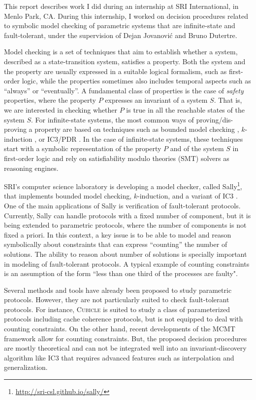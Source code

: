
This report describes work I did during an internship at SRI
International, in Menlo Park, CA. During this internship, I worked on
decision procedures related to symbolic model checking of parametric
systems that are infinite-state and fault-tolerant, under the
supervision of Dejan Jovanović and Bruno Dutertre.

Model checking is a set of techniques that aim to establish whether a
system, described as a state-transition system, satisfies a property.
Both the system and the property are usually expressed in a suitable
logical formalism, such as first-order logic, while the properties
sometimes also includes temporal aspects such as ``always'' or
``eventually''. A fundamental class of properties is the case of
\emph{safety} properties, where the property $P$ expresses an
invariant of a system $S$. That is, we are interested in checking
whether $P$ is true in all the reachable states of the system $S$. For
infinite-state systems, the most common ways of proving/dis-proving a
property are based on techniques such as bounded model checking
\cite{biere2003bounded}, $k$-induction \cite{sheeran2000checking}, or
IC3/PDR \cite{pdr}. In the case of infinite-state systems, these
techniques start with a symbolic representation of the property $P$
and of the system $S$ in first-order logic and rely on satisfiability
modulo theories (SMT) solvers \cite{barrett2009satisfiability} as
reasoning engines.

SRI's computer science laboratory is developing a model checker,
called Sally\footnote{\url{http://sri-csl.github.io/sally/}}, that
implements bounded model checking, $k$-induction, and a variant of IC3
\cite{jovanovic2016property}. One of the main applications of Sally is
verification of fault-tolerant protocols. Currently, Sally can handle
protocols with a fixed number of component, but it is being extended
to parametric protocols, where the number of components is not fixed a
priori. In this context, a key issue is to be able to model and reason
symbolically about constraints that can express ``counting'' the
number of solutions. The ability to reason about number of solutions
is specially important in modeling of fault-tolerant protocols. A
typical example of counting constraints is an assumption of the form
``less than one third of the processes are faulty".


Several methods and tools have already been proposed to study
parametric protocols. However, they are not particularly suited to
check fault-tolerant protocols. For instance, \textsc{Cubicle}
\cite{ConchonGKMZ12} is suited to study a class of parameterized
protocols including cache coherence protocols, but is not equipped to
deal with counting constraints. On the other hand, recent developments
of the MCMT framework \cite{AlbertiGP16} allow for counting
constraints. But, the proposed decision procedures are mostly
theoretical and can not be integrated well into an invariant-discovery
algorithm like IC3 that requires advanced features such as
interpolation and generalization.

